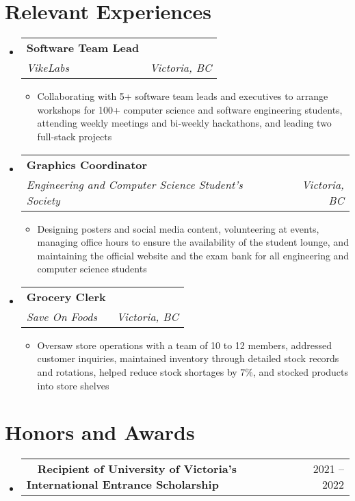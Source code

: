 \documentclass[a4paper,10pt]{article}
\makeatletter
\newcommand{\resumeItemDot}[1]
{\item \normalsize{#1}}
\newcommand{\resumeSubheading}[4]{
  \item
    \begin{tabular*}{\dimexpr\textwidth-1.2em\relax}{@{}l@{\extracolsep{\fill}}r@{}}
      \large \textbf{#1} & \fontsize{11}{12}\selectfont \text{#2} \\
      \textit{#3} & \textit{#4} \\
    \end{tabular*}\vspace{-2pt}
}
\newcommand{\resumeScholarshipSubheading}[2]{
  \item
    \begin{tabular*}{\dimexpr\textwidth-1.2em\relax}{@{}l@{\extracolsep{\fill}}r@{}}
      \textbullet \ \ \textbf{#1} & \normalsize{#2} \\
    \end{tabular*}\vspace{-2pt}
}
\newenvironment{resumeSubHeadingListStart}
{\begin{itemize}[leftmargin=0.10in, label={}]}
{\end{itemize}}
\newenvironment{resumeItemListStart}
{\begin{itemize}[leftmargin=0.15in, label={$\bullet$}]}
{\end{itemize}}
\makeatother
\begin{document}
\section{Relevant Experiences}
\begin{resumeSubHeadingListStart}
\resumeSubheading
    {Software Team Lead}
    {Feb 2024 – Present}
    {VikeLabs}
    {Victoria, BC}
\begin{resumeItemListStart}
    \resumeItemDot{Collaborating with 5+ software team leads and executives to arrange workshops for 100+ computer science and software engineering students, attending weekly meetings and bi-weekly hackathons, and leading two full-stack projects}
\end{resumeItemListStart}
\end{resumeSubHeadingListStart}

\begin{resumeSubHeadingListStart}
\resumeSubheading
    {Graphics Coordinator}
    {Jan 2023 – Present}
    {Engineering and Computer Science Student’s Society}
    {Victoria, BC}
\begin{resumeItemListStart}
    \resumeItemDot{Designing posters and social media content, volunteering at events, managing office hours to ensure the availability of the student lounge, and maintaining the official website and the exam bank for all engineering and computer science students}
\end{resumeItemListStart}
\end{resumeSubHeadingListStart}

\begin{resumeSubHeadingListStart}
\resumeSubheading
    {Grocery Clerk}
    {Apr 2022 – Sept 2022}
    {Save On Foods}
    {Victoria, BC}
\begin{resumeItemListStart}
    \resumeItemDot{Oversaw store operations with a team of 10 to 12 members, addressed customer inquiries, maintained inventory through detailed stock records and rotations, helped reduce stock shortages by 7\%, and stocked products into store shelves}
\end{resumeItemListStart}
\end{resumeSubHeadingListStart}

\section{Honors and Awards}
\begin{resumeSubHeadingListStart}
\resumeScholarshipSubheading{Recipient of University of Victoria’s International Entrance Scholarship}{2021 – 2022}
\end{resumeSubHeadingListStart}
\end{document}
